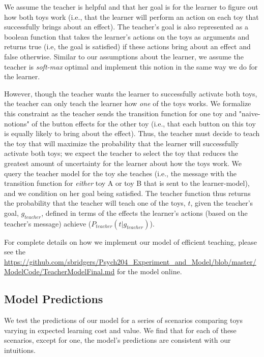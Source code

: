 \documentclass[10pt,letterpaper]{article}
\begin{document}
We assume the teacher is helpful and that her goal is for the learner to figure out how both toys work (i.e., that the learner will perform an action on each toy that successfully brings about an effect). The teacher's goal is also represented as a boolean function that takes the learner's actions on the toys as arguments and returns true (i.e, the goal is satisfied) if these actions bring about an effect and false otherwise. Similar to our assumptions about the learner, we assume the teacher is \textit{soft-max} optimal and implement this notion in the same way we do for the learner. 

However, though the teacher wants the learner to successfully activate both toys, the teacher can only teach the learner how \textit{one} of the toys works. We formalize this constraint as the teacher sends the transition function for one toy and "naive-notions" of the button effects for the other toy (i.e., that each button on this toy is equally likely to bring about the effect). Thus, the teacher must decide to teach the toy that will maximize the probability that the learner will successfully activate both toys; we expect the teacher to select the toy that reduces the greatest amount of uncertainty for the learner about how the toys work. We query the teacher model for the toy she teaches (i.e., the message with the transition function for \textit{either} toy A or toy B that is sent to the learner-model), and we condition on her goal being satisfied. The teacher function thus returns the probability that the teacher will teach one of the toys, $t$, given the teacher's goal, $g_{teacher}$, defined in terms of the effects the learner's actions (based on the teacher's message) achieve ($P_{teacher}(t | g_{teacher})$).

For complete details on how we implement our model of efficient teaching, please see the \url{https://github.com/sbridgers/Psych204_Experiment_and_Model/blob/master/ModelCode/TeacherModelFinal.md} for the model online.

\subsection{Model Predictions}

We test the predictions of our model for a series of scenarios comparing toys varying in expected learning cost and value. We find that for each of these scenarios, except for one, the model's predictions are consistent with our intuitions. 
\end{document}
